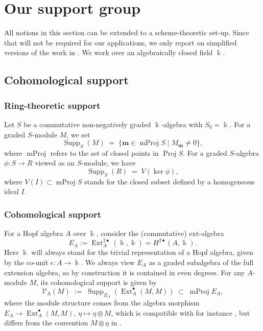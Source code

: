\documentclass{amsart}
\numberwithin{equation}{section}
\theoremstyle{definition}
\theoremstyle{remark}
\newcommand{\bk}{\Bbbk}
\newcommand{\Ext}{\operatorname{Ext}}
\newcommand{\Supp}{\operatorname{Supp}}
\newcommand{\mProj}{\operatorname{mProj}}
\newcommand{\Proj}{\operatorname{Proj}}
\newcommand{\fm}{\mathbf{m}}
\newcommand{\cV}{\mathcal{V}}
\begin{document}
\section{Our support group}\label{sec:NP}


All notions in this section can be extended to a scheme-theoretic set-up. Since that will not be required for our applications, we only report on simplified versions of the work in \cite{NP1,NP2}. We work over an algebraically closed field $\bk$.


\subsection{Cohomological support}

\subsubsection{Ring-theoretic support}
Let $S$ be a commutative non-negatively graded $\bk$-algebra  with $S_0=\bk$. For a graded $S$-module $M$, we set
\[\Supp_S(M)\;=\;\{\fm\in\mProj S\mid M_{\fm}\not=0\},\]
where $\mProj$ refers to the set of closed points in $\Proj S$. For a graded $S$-algebra $\phi:S\to R$ viewed as an $S$-module, we have
\begin{equation}\label{eq:suppphi}\Supp_S(R)\;=\; V(\ker \phi),\end{equation}
where $V(I)\subset\mProj S$ stands for the closed subset defined by a homogeneous ideal $I$.

\subsubsection{Cohomological support}
For a Hopf algebra $A$ over $\bk$, consider the (commutative) ext-algebra
\[E_A:=\Ext^{2\bullet}_A(\bk,\bk)=H^{2\bullet}(A,\bk).\]
Here $\bk$ will always stand for the trivial representation of a Hopf algebra, given by the co-unit $\epsilon:A\to\bk$.
We always view $E_A$ as a graded subalgebra of the full extension algebra, so by construction it is contained in even degrees.
For any $A$-module $M$, its cohomological support is given by
\[\cV_A(M)\;:=\;\Supp_{E_A}(\Ext^\bullet_A(M,M))\;\subset\; \mProj E_A,\]
where the module structure comes from the algebra morphism $E_A\to\Ext^\bullet_A(M,M)$, $\eta\mapsto  \eta\otimes M$, which is compatible with for instance \cite{Dr1}, but differs from the convention $M\otimes \eta$ in \cite{NP2}.
\end{document}
